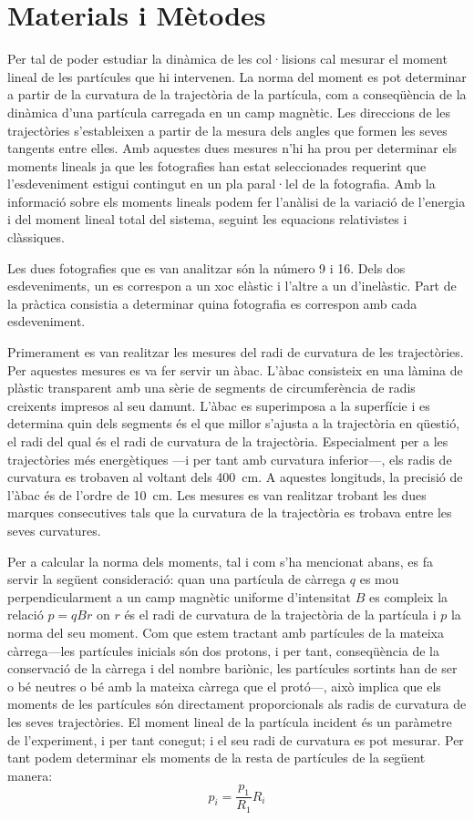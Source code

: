 \documentclass[12pt]{article}
\begin{document}
\section{Materials i Mètodes}
Per tal de poder estudiar la dinàmica de les col·lisions cal mesurar el moment lineal de les partícules que hi intervenen. La norma del moment es pot determinar a partir de la curvatura de la trajectòria de la partícula, com a conseqüència de la dinàmica d'una partícula carregada en un camp magnètic. Les direccions de les trajectòries s'estableixen a partir de la mesura dels angles que formen les seves tangents entre elles. Amb aquestes dues mesures n'hi ha prou per determinar els moments lineals ja que les fotografies han estat seleccionades requerint que l'esdeveniment estigui contingut en un pla paral·lel de la fotografia. Amb la informació sobre els moments lineals podem fer l'anàlisi de la variació de l'energia i del moment lineal total del sistema, seguint les equacions relativistes i clàssiques. 

Les dues fotografies que es van analitzar són la número 9 i 16. Dels dos esdeveniments, un es correspon a un xoc elàstic i l'altre a un d'inelàstic. Part de la pràctica consistia a determinar quina fotografia es correspon amb cada esdeveniment. 

Primerament es van realitzar les mesures del radi de curvatura de les trajectòries. Per aquestes mesures es va fer servir un àbac. L'àbac consisteix en una làmina de plàstic transparent amb una sèrie de segments de circumferència de radis creixents impresos al seu damunt. L'àbac es superimposa a la superfície i es determina quin dels segments és el que millor s'ajusta a la trajectòria en qüestió, el radi del qual és el radi de curvatura de la trajectòria. Especialment per a les trajectòries més energètiques ---i per tant amb curvatura inferior---, els radis de curvatura es trobaven al voltant dels \SI{400}{cm}. A aquestes longituds, la precisió de l'àbac és de l'ordre de \SI{10}{cm}. Les mesures es van realitzar trobant les dues marques consecutives tals que la curvatura de la trajectòria es trobava entre les seves curvatures. 

Per a calcular la norma dels moments, tal i com s'ha mencionat abans, es fa servir la següent consideració: quan una partícula de càrrega \( q \) es mou perpendicularment a un camp magnètic uniforme d'intensitat \( B \) es compleix la relació \( p = qBr \) on \( r \) és el radi de curvatura de la trajectòria de la partícula i \( p \) la norma del seu moment. Com que estem tractant amb partícules de la mateixa càrrega---les partícules inicials són dos protons, i per tant, conseqüència de la conservació de la càrrega i del nombre bariònic, les partícules sortints han de ser o bé neutres o bé amb la mateixa càrrega que el protó---, això implica que els moments de les partícules són directament proporcionals als radis de curvatura de les seves trajectòries. El moment lineal de la partícula incident és un paràmetre de l'experiment, i per tant conegut; i el seu radi de curvatura es pot mesurar. Per tant podem determinar els moments de la resta de partícules de la següent manera:
\begin{equation}
	p_{i} = \dfrac{p_{1}}{R_{1}}R_{i}
\end{equation}
\end{document}
